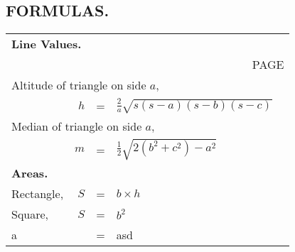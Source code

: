 \documentclass{book}
\begin{document}
\newpage
\subsection{FORMULAS.}
\newcommand\test{
\begin{minipage}{3cm}
asd
\end{minipage}
}
\noindent\begin{longtable}{lr@{~}c@{~}l@{\qquad}r}
\multicolumn{5}{l}{\hspace{-2ex}\textbf{Line Values.}} \\
\multicolumn{5}{r}{\tiny PAGE}\\
\multicolumn{4}{l}{Altitude of triangle on side $a$,} \\
& $h$ &=& \( \displaystyle \frac{2}{a}
             \sqrt{s(s-a)(s-b)(s-c)} \) & \pageref{aref} \\
%
\multicolumn{4}{l}{Median of triangle on side $a$,} \\
& $m$ &=& \( \frac{1}{2} \sqrt{2(b^2+c^2) - a^2} \) & \pageref{aref} \\
\multicolumn{5}{l}{\hspace{-2ex}\textbf{Areas.}} \\
%
Rectangle,     & $S$ &=& $b\times h$ & \pageref{aref} \\
Square,         & $S$ &=& $b^2$        & \pageref{aref1} \\
a                  &        &=&\test            &\\
\end{longtable}

\end{document}
